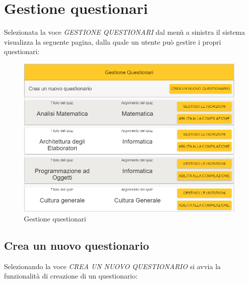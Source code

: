 \newpage
\section{Gestione questionari}
Selezionata la voce \textit{GESTIONE QUESTIONARI} dal menù a sinistra il sistema visualizza la seguente pagina, dalla quale un utente può gestire i propri questionari:

\label{GestioneQuestionari}
\begin{figure}[ht]
	\centering
	\includegraphics[scale=0.50]{img/gestione_questionari.png}
	\caption{Gestione questionari}
\end{figure}
\FloatBarrier

\newpage
\subsection{Crea un nuovo questionario}
Selezionando la voce \textit{CREA UN NUOVO QUESTIONARIO} si avvia la funzionalità di creazione di un questionario:

